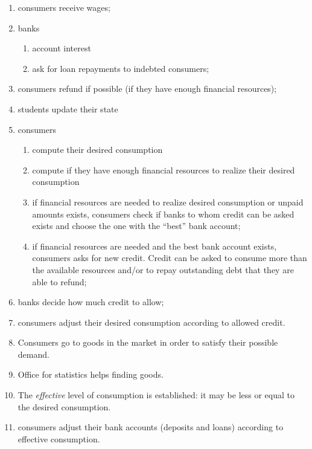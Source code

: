 \documentclass{article}
\begin{document}
\begin{enumerate}
	\item consumers receive wages;
	\item banks 
		\begin{enumerate}
			\item account interest
			\item ask for loan repayments to indebted consumers;
		\end{enumerate}
	\item consumers refund if possible (if they have enough financial resources);
	\item students update their state
	\item consumers 
		\begin{enumerate}
			\item compute their desired consumption
			\item compute if they have enough financial resources to realize their desired consumption
			\item if financial resources are needed to realize desired consumption or unpaid amounts exists, consumers check if banks to whom credit can be asked exists and choose the one with the ``best'' bank account;
			\item if financial resources are needed and the best bank account exists, consumers asks for new credit. Credit can be asked to consume more than the available resources and/or to repay outstanding debt that they are able to refund;
		\end{enumerate}
	\item banks decide how much credit to allow;
	\item consumers adjust their desired consumption according to allowed credit. 
	\item Consumers go to goods in the market in order to satisfy their possible demand.
	\item Office for statistics helps finding goods.
	\item The \textit{effective} level of consumption is established: it may be less or equal to the desired consumption.
	\item consumers adjust their bank accounts (deposits and loans) according to effective consumption.
\end{enumerate}
\end{document}
